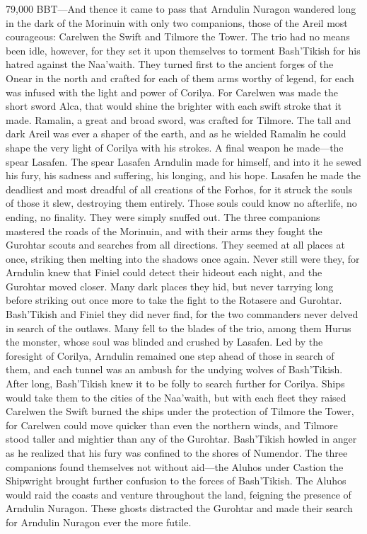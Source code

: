 \documentclass[smalldemyvopaper,11pt,twoside,onecolumn,openright,extrafontsizes]{memoir}
\begin{document}
79,000 BBT—And thence it came to pass that Arndulin Nuragon wandered long in the dark of the Morinuin with only two companions, those of the Areil most courageous: Carelwen the Swift and Tilmore the Tower. The trio had no means been idle, however, for they set it upon themselves to torment Bash’Tikish for his hatred against the Naa’waith. They turned first to the ancient forges of the Onear in the north and crafted for each of them arms worthy of legend, for each was infused with the light and power of Corilya. For Carelwen was made the short sword Alca, that would shine the brighter with each swift stroke that it made. Ramalin, a great and broad sword, was crafted for Tilmore. The tall and dark Areil was ever a shaper of the earth, and as he wielded Ramalin he could shape the very light of Corilya with his strokes. A final weapon he made—the spear Lasafen. The spear Lasafen Arndulin made for himself, and into it he sewed his fury, his sadness and suffering, his longing, and his hope. Lasafen he made the deadliest and most dreadful of all creations of the Forhos, for it struck the souls of those it slew, destroying them entirely. Those souls could know no afterlife, no ending, no finality. They were simply snuffed out.
	The three companions mastered the roads of the Morinuin, and with their arms they fought the Gurohtar scouts and searches from all directions. They seemed at all places at once, striking then melting into the shadows once again. Never still were they, for Arndulin knew that Finiel could detect their hideout each night, and the Gurohtar moved closer. Many dark places they hid, but never tarrying long before striking out once more to take the fight to the Rotasere and Gurohtar. Bash’Tikish and Finiel they did never find, for the two commanders never delved in search of the outlaws. Many fell to the blades of the trio, among them Hurus the monster, whose soul was blinded and crushed by Lasafen. Led by the foresight of Corilya, Arndulin remained one step ahead of those in search of them, and each tunnel was an ambush for the undying wolves of Bash’Tikish. After long, Bash’Tikish knew it to be folly to search further for Corilya. Ships would take them to the cities of the Naa’waith, but with each fleet they raised Carelwen the Swift burned the ships under the protection of Tilmore the Tower, for Carelwen could move quicker than even the northern winds, and Tilmore stood taller and mightier than any of the Gurohtar. Bash’Tikish howled in anger as he realized that his fury was confined to the shores of Numendor.
	The three companions found themselves not without aid—the Aluhos under Castion the Shipwright brought further confusion to the forces of Bash’Tikish. The Aluhos would raid the coasts and venture throughout the land, feigning the presence of Arndulin Nuragon. These ghosts distracted the Gurohtar and made their search for Arndulin Nuragon ever the more futile.
\end{document}
